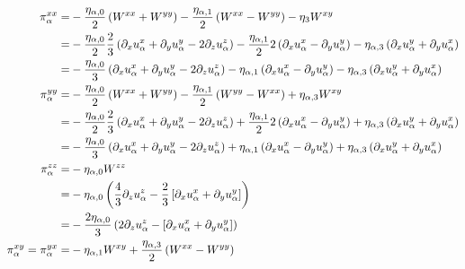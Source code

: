 \begin{align*}
    \pi^{xx}_{\a}
    =& -\frac{\eta_{\a,0}}{2}\L(W^{xx} + W^{yy}\R)
       -\frac{\eta_{\a,1}}{2}\L(W^{xx} - W^{yy}\R)
       -\eta_3 W^{xy}
    \\
    =& -\frac{\eta_{\a,0}}{2}
            \frac{2}{3}\L(\partial_x u^{x}_{\a}
              + \partial_y u^{y}_{\a}
              - 2\partial_z u^{z}_{\a} \R)
       -\frac{\eta_{\a,1}}{2}
            2\L(\partial_x u^{x}_{\a} - \partial_y u^{y}_{\a} \R)
            -\eta_{\a,3}
       \L( \partial_x u^{y}_{\a} + \partial_y u^{x}_{\a} \R)
     \\
    =& -\frac{\eta_{\a,0}}{3}
                       \L(\partial_x u^{x}_{\a}
              + \partial_y u^{y}_{\a}
              - 2\partial_z u^{z}_{\a} \R)
       -      \eta_{\a,1}
             \L(\partial_x u^{x}_{\a} - \partial_y u^{y}_{\a} \R)
             -\eta_{\a,3}
       \L( \partial_x u^{y}_{\a} + \partial_y u^{x}_{\a} \R)
    \\
\pi^{yy}_{\a}
    =& -\frac{\eta_{\a,0}}{2}\L(W^{xx} + W^{yy}\R)
       -\frac{\eta_{\a,1}}{2}\L(W^{yy} - W^{xx}\R)
       +\eta_{\a,3}W^{xy}
    \\
    =& -\frac{\eta_{\a,0}}{2}
    \frac{2}{3}\L(\partial_x u^{x}_{\a}
              + \partial_y u^{y}_{\a}
              - 2\partial_z u^{z}_{\a} \R)
              + \frac{ \eta_{\a,1}}{2}
       2 \L(\partial_x u^{x}_{\a} - \partial_y u^{y}_{\a} \R)
     +\eta_{\a,3}
     \L( \partial_x u^{y}_{\a} + \partial_y u^{x}_{\a} \R)
    \\
    =& -\frac{\eta_{\a,0}}{3}
                       \L(\partial_x u^{x}_{\a}
              + \partial_y u^{y}_{\a}
              - 2\partial_z u^{z}_{\a} \R)
       +      \eta_{\a,1}
             \L(\partial_x u^{x}_{\a} - \partial_y u^{y}_{\a} \R)
       +\eta_{\a,3}
       \L( \partial_x u^{y}_{\a} + \partial_y u^{x}_{\a} \R)
    \\
\pi^{zz}_{\a}
    =& -\eta_{\a,0}W^{zz}
    \\
    =& -\eta_{\a,0}
        \L(
        \frac{4}{3} \partial_z u^{z}_{\a} - \frac{2}{3}
        \L[\partial_x u^{x}_{\a}
           +\partial_y u^{y}_{\a}
        \R]
        \R)
    \\
    =& -\frac{2\eta_{\a,0}}{3}
        \L(
        2\partial_z u^{z}_{\a} -
        \L[\partial_x u^{x}_{\a}
           +\partial_y u^{y}_{\a}
        \R]
        \R)
    \\
\pi^{xy}_{\a} = \pi^{yx}_{\a}
=& -\eta_{\a,1} W^{xy}
    +\frac{\eta_{\a,3}}{2} \L(W^{xx}-W^{yy}\R)

\end{align*}
